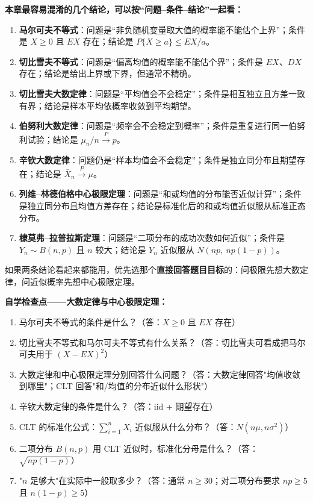 ﻿\documentclass[lang=cn,11pt]{elegantbook}
\begin{document}
\begin{note}
\textbf{本章最容易混淆的几个结论，可以按“问题--条件--结论”一起看：}
\begin{enumerate}
    \item \textbf{马尔可夫不等式}：问题是“非负随机变量取大值的概率能不能估个上界”；条件是 \(X\ge0\) 且 \(EX\) 存在；结论是 \(P\{X\ge a\}\le EX/a\)。
    \item \textbf{切比雪夫不等式}：问题是“偏离均值的概率能不能估个界”；条件是 \(EX\)、\(DX\) 存在；结论是给出上界或下界，但通常不精确。
    \item \textbf{切比雪夫大数定律}：问题是“平均值会不会稳定”；条件是相互独立且方差一致有界；结论是样本平均依概率收敛到平均期望。
    \item \textbf{伯努利大数定律}：问题是“频率会不会稳定到概率”；条件是重复进行同一伯努利试验；结论是 \(\mu_n/n \stackrel{P}{\longrightarrow} p\)。
    \item \textbf{辛钦大数定律}：问题仍是“样本均值会不会稳定”；条件是独立同分布且期望存在；结论是 \(\bar X_n \stackrel{P}{\longrightarrow} \mu\)。
    \item \textbf{列维--林德伯格中心极限定理}：问题是“和或均值的分布能否近似计算”；条件是独立同分布且均值方差存在；结论是标准化后的和或均值近似服从标准正态分布。
    \item \textbf{棣莫弗--拉普拉斯定理}：问题是“二项分布的成功次数如何近似”；条件是 \(Y_n \sim B(n,p)\) 且 \(n\) 较大；结论是 \(Y_n\) 近似服从 \(N(np,\ np(1-p))\)。
\end{enumerate}

如果两条结论看起来都能用，优先选那个\textbf{直接回答题目目标}的：问极限先想大数定律，问近似概率先想中心极限定理。
\end{note}

\begin{note}
\textbf{自学检查点——大数定律与中心极限定理：}
\begin{enumerate}
    \item 马尔可夫不等式的条件是什么？（答：\(X\ge 0\) 且 \(EX\) 存在）
    \item 切比雪夫不等式和马尔可夫不等式有什么关系？（答：切比雪夫可看成把马尔可夫用于 \((X-EX)^2\)）
    \item 大数定律和中心极限定理分别回答什么问题？（答：大数定律回答"均值收敛到哪里"；CLT 回答"和/均值的分布近似什么形状"）
    \item 辛钦大数定律的条件是什么？（答：iid + 期望存在）
    \item CLT 的标准化公式：$\sum_{i=1}^n X_i$ 近似服从什么分布？（答：$N(n\mu, n\sigma^2)$）
    \item 二项分布 $B(n,p)$ 用 CLT 近似时，标准化分母是什么？（答：$\sqrt{np(1-p)}$）
    \item "$n$ 足够大"在实际中一般取多少？（答：通常 $n\geqslant 30$；对二项分布要求 $np\geqslant 5$ 且 $n(1-p)\geqslant 5$）
\end{enumerate}
\end{note}
\end{document}
